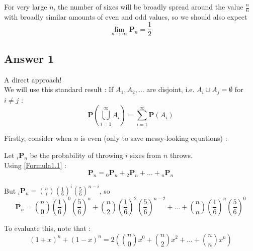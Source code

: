 \documentclass[a4paper,10pt]{article}
\begin{document}
\begin{flushleft}
For very large $n$, the number of sixes will be broadly spread around the value $\frac{n}{6}$ with broadly similar amounts of even and odd values, so we should also expect  
\begin{equation*} 
\lim_{n \rightarrow \infty} \mathbf{P}_n = \frac{1}{2} 
\end{equation*}

\subsection{Answer 1}

A direct approach! \\

We will use this standard result : If $A_1, A_2, \ldots$ are disjoint, i.e. $A_i \cup A_j = \emptyset$ for $i \neq j$ : 
\begin{equation} 
\mathbf{P} (\bigcup_{i=1}^\infty A_i) = \sum_{i=1}^\infty \mathbf{P}(A_i) 
\tag{F1.1} \label{Formula1.1}
\end{equation}

Firstly, consider when $n$ is even (only to save messy-looking equations) :

Let ${}_i\mathbf{P}_n$ be the probability of throwing $i$ sixes from $n$ throws.  \\
Using \eqref{Formula1.1} :
\begin{equation*} 
\mathbf{P}_n = {}_0\mathbf{P}_n + {}_2\mathbf{P}_n + \ldots + {}_n\mathbf{P}_n    
\end{equation*} 

But ${}_i\mathbf{P}_n = \binom{n}{i} \left(\frac{1}{6}\right)^i \left(\frac{5}{6}\right)^{n-i}  $, so
\begin{equation*} 
\mathbf{P}_n = \binom{n}{0} \left(\frac{1}{6}\right)^0 \left(\frac{5}{6}\right)^{n} + 
\binom{n}{2} \left(\frac{1}{6}\right)^2 \left(\frac{5}{6}\right)^{n-2} + \ldots + \binom{n}{n} \left(\frac{1}{6}\right)^n \left(\frac{5}{6}\right)^{0}
\end{equation*}

To evaluate this, note that : 
\begin{equation*} 
\left(1+x\right)^n + \left(1-x\right)^n = 2\left(\binom{n}{0}x^0 + \binom{n}{2}x^2 + \ldots + \binom{n}{n}x^n\right)
\end{equation*} 


\end{flushleft}
\end{document}
